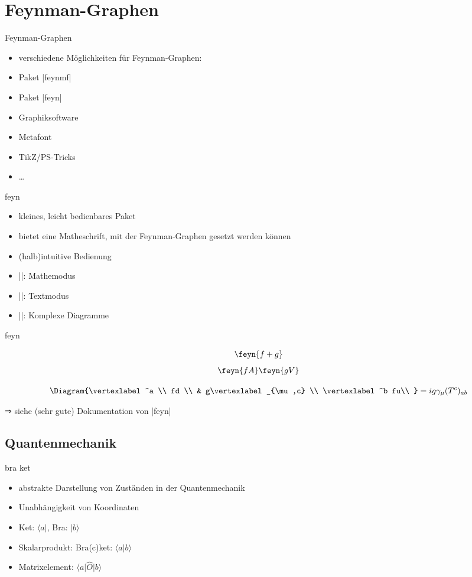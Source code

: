 \documentclass[
	vorläufig=false,
	datum=2022-11-09,
	titel={Mathematiksatz},
	web=false,
	max,
	aspectratio=1610,
]{../tex/latexkurs-slides}
\begin{document}
\section{Feynman-Graphen}
\begin{frame}[fragile]{Feynman-Graphen}
\begin{itemize}
\item verschiedene Möglichkeiten für Feynman-Graphen:
\item Paket |feynmf|
\item Paket |feyn|
\item Graphiksoftware
\item Metafont
\item TikZ/PS-Tricks
\item …
\end{itemize}
\end{frame}

\begin{frame}[fragile]{feyn}
\begin{itemize}
\item kleines, leicht bedienbares Paket
\item bietet eine Matheschrift, mit der Feynman-Graphen gesetzt werden können
\item (halb)intuitive Bedienung
\item |\feyn|: Mathemodus
\item |\Feyn|: Textmodus
\item |\Diagram|: Komplexe Diagramme
\end{itemize}
\end{frame}

\begin{frame}[fragile]{feyn}
\begin{LTXexample}
\[\feyn{f+g}\]
\[\feyn{fA} \feyn{gV}\]
\end{LTXexample}
\begin{LTXexample}
\[\Diagram{\vertexlabel^a \\
  fd \\
    & g\vertexlabel_{\mu,c} \\
  \vertexlabel^b fu\\
}
= ig\gamma_\mu (T^c)_{ab}\]
\end{LTXexample}
\pause
⇒ siehe (sehr gute) Dokumentation von |feyn|
\end{frame}
\fi


\subsection{Quantenmechanik}
\begin{frame}[fragile]{bra ket}
\begin{itemize}
\item abstrakte Darstellung von Zuständen in der Quantenmechanik
\item Unabhängigkeit von Koordinaten
\item Ket: $\langle a\rvert$, Bra: $\lvert b \rangle$
\item Skalarprodukt: Bra(c)ket: $\langle a \vert b\rangle$
\item Matrixelement: $\langle a\vert \hat O \vert b \rangle$
\end{itemize}
\end{frame}
\end{document}
